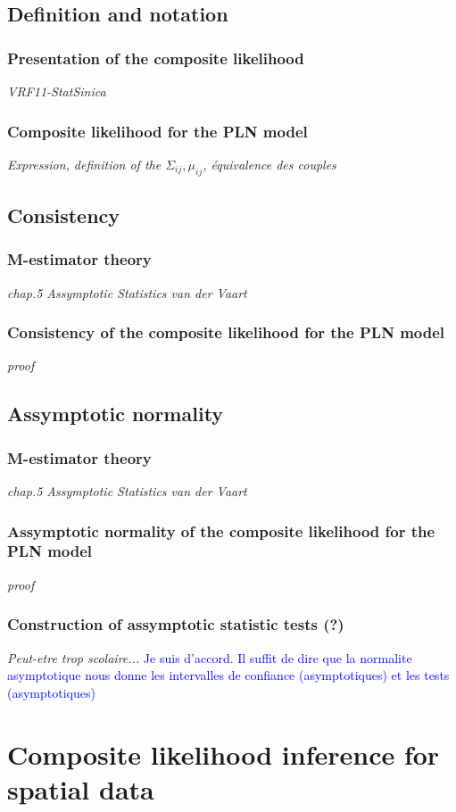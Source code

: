 \documentclass[11pt, a4paper]{article}
\newcommand{\SR}[2]{\textcolor{gray}{#1}\textcolor{blue}{#2}}
\begin{document}
\subsection{Definition and notation}
\subsubsection{Presentation of the composite likelihood}
\textit{VRF11-StatSinica}
\subsubsection{Composite likelihood for the PLN model}
\textit{Expression, definition of the $\Sigma_{ij},\mu_{ij}$, \'equivalence des couples}
\subsection{Consistency}
\subsubsection{M-estimator theory}
\textit{chap.5 Assymptotic Statistics van der Vaart}
\subsubsection{Consistency of the composite likelihood for the PLN model}
\textit{proof}
\subsection{Assymptotic normality}
\subsubsection{M-estimator theory}
\textit{chap.5 Assymptotic Statistics van der Vaart}
\subsubsection{Assymptotic normality of the composite likelihood for the PLN model}
\textit{proof}
\subsubsection{Construction of assymptotic statistic tests (?)}
\textit{Peut-etre trop scolaire...} \SR{}{Je suis d'accord. Il suffit de dire que la normalite asymptotique nous donne les intervalles de confiance (asymptotiques) et les tests (asymptotiques)}

\section{Composite likelihood inference for spatial data}
\end{document}
